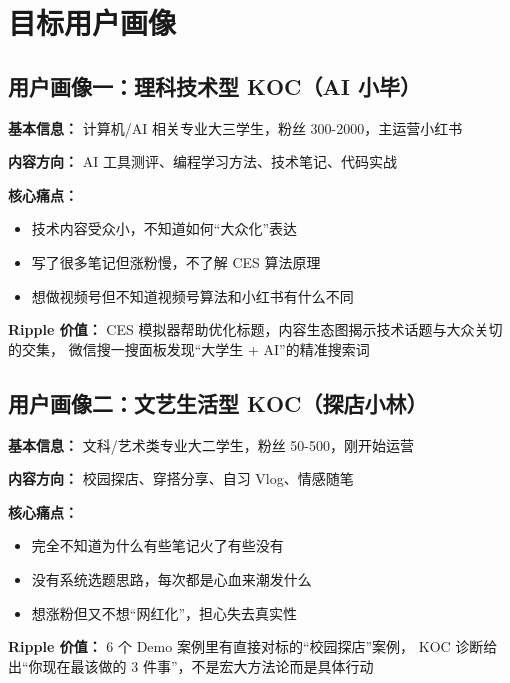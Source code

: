 \documentclass[12pt,a4paper]{ctexart}
\begin{document}
\section{目标用户画像}

\subsection{用户画像一：理科技术型 KOC（AI 小毕）}

\begin{tcolorbox}[colback=lightbg,colframe=primary!40,arc=5pt,
  left=8pt,right=8pt,top=6pt,bottom=6pt]
\textbf{基本信息：} 计算机/AI 相关专业大三学生，粉丝 300-2000，主运营小红书

\textbf{内容方向：} AI 工具测评、编程学习方法、技术笔记、代码实战

\textbf{核心痛点：}
\begin{itemize}
  \item 技术内容受众小，不知道如何``大众化''表达
  \item 写了很多笔记但涨粉慢，不了解 CES 算法原理
  \item 想做视频号但不知道视频号算法和小红书有什么不同
\end{itemize}

\textbf{Ripple 价值：} CES 模拟器帮助优化标题，内容生态图揭示技术话题与大众关切的交集，
微信搜一搜面板发现``大学生 + AI''的精准搜索词
\end{tcolorbox}

\subsection{用户画像二：文艺生活型 KOC（探店小林）}

\begin{tcolorbox}[colback=lightbg,colframe=secondary!40,arc=5pt,
  left=8pt,right=8pt,top=6pt,bottom=6pt]
\textbf{基本信息：} 文科/艺术类专业大二学生，粉丝 50-500，刚开始运营

\textbf{内容方向：} 校园探店、穿搭分享、自习 Vlog、情感随笔

\textbf{核心痛点：}
\begin{itemize}
  \item 完全不知道为什么有些笔记火了有些没有
  \item 没有系统选题思路，每次都是心血来潮发什么
  \item 想涨粉但又不想``网红化''，担心失去真实性
\end{itemize}

\textbf{Ripple 价值：} 6 个 Demo 案例里有直接对标的``校园探店''案例，
KOC 诊断给出``你现在最该做的 3 件事''，不是宏大方法论而是具体行动
\end{tcolorbox}
\end{document}
